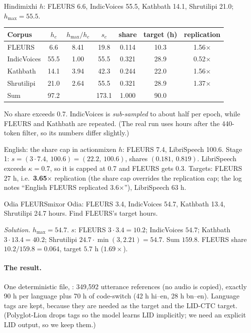 \begin{example}{Hindi}{mixhi}
$h$: FLEURS 6.6, IndicVoices 55.5, Kathbath 14.1, Shrutilipi 21.0; $h_{\max}=55.5$.
\begin{center}
\begin{tabular}{lcccccc}
\toprule
Corpus & $h_c$ & $h_{\max}/h_c$ & $s_c$ & share & target (h) & replication\\
\midrule
FLEURS & 6.6 & 8.41 & 19.8 & 0.114 & 10.3 & 1.56$\times$\\
IndicVoices & 55.5 & 1.00 & 55.5 & 0.321 & 28.9 & 0.52$\times$\\
Kathbath & 14.1 & 3.94 & 42.3 & 0.244 & 22.0 & 1.56$\times$\\
Shrutilipi & 21.0 & 2.64 & 55.5 & 0.321 & 28.9 & 1.37$\times$\\
\midrule
Sum & 97.2 & & 173.1 & 1.000 & 90.0 & \\
\bottomrule
\end{tabular}
\end{center}
No share exceeds 0.7. IndicVoices is \emph{sub-sampled} to about half per epoch, while FLEURS and Kathbath are repeated. (The real
run uses hours after the 440-token filter, so its numbers differ slightly.)
\end{example}

\begin{example}{English: the share cap in action}{mixen}
$h$: FLEURS 7.4, LibriSpeech 100.6. Stage 1: $s=(3\cdot7.4,\ 100.6)=(22.2,\ 100.6)$, shares $(0.181,\ 0.819)$. LibriSpeech exceeds
$\kappa=0.7$, so it is capped at 0.7 and FLEURS gets $0.3$. Targets: FLEURS $27$ h, i.e.\ \textbf{3.65$\times$} replication
(the share cap overrides the replication cap; the log notes ``English FLEURS replicated 3.6$\times$''), LibriSpeech 63 h.
\end{example}

\begin{exercise}{Odia FLEURS}{mixor}
Odia: FLEURS 3.4, IndicVoices 54.7, Kathbath 13.4, Shrutilipi 24.7 hours. Find FLEURS's target hours.\par
\textit{Solution.} $h_{\max}=54.7$. $s$: FLEURS $3\cdot3.4=10.2$; IndicVoices $54.7$; Kathbath $3\cdot13.4=40.2$; Shrutilipi
$24.7\cdot\min(3,2.21)=54.7$. Sum $159.8$. FLEURS share $10.2/159.8=0.064$, target $5.7$ h ($1.69\times$).
\end{exercise}

\paragraph{The result.} One deterministic file, : 349{,}592 utterance references (no audio is
copied), exactly 90 h per language plus 70 h of code-switch (42 h hi--en, 28 h bn--en). Language tags are kept, because they are
needed as the \tok{$\ell$} target and the LID-CTC target. (Polyglot-Lion drops tags so the model learns LID implicitly; we need an
explicit LID output, so we keep them.)

